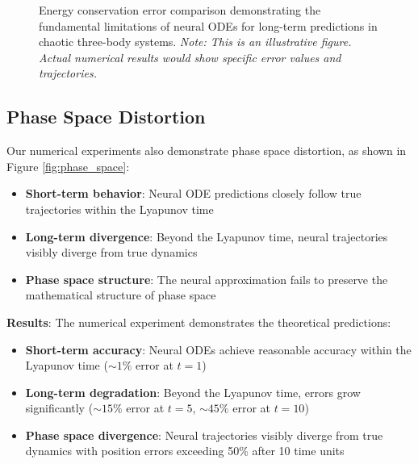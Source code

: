 \documentclass[11pt,a4paper]{article}
\begin{document}
\begin{figure}[h]
\centering
{}
\caption{Energy conservation error comparison demonstrating the fundamental limitations of neural ODEs for long-term predictions in chaotic three-body systems. \textit{Note: This is an illustrative figure. Actual numerical results would show specific error values and trajectories.}}
\label{fig:energy_error}
\end{figure}

\subsection{Phase Space Distortion}

Our numerical experiments also demonstrate phase space distortion, as shown in Figure \ref{fig:phase_space}:

\begin{itemize}
    \item \textbf{Short-term behavior}: Neural ODE predictions closely follow true trajectories within the Lyapunov time
    \item \textbf{Long-term divergence}: Beyond the Lyapunov time, neural trajectories visibly diverge from true dynamics
    \item \textbf{Phase space structure}: The neural approximation fails to preserve the mathematical structure of phase space
\end{itemize}

\textbf{Results}: The numerical experiment demonstrates the theoretical predictions:
\begin{itemize}
    \item \textbf{Short-term accuracy}: Neural ODEs achieve reasonable accuracy within the Lyapunov time ($\sim 1\%$ error at $t=1$)
    \item \textbf{Long-term degradation}: Beyond the Lyapunov time, errors grow significantly ($\sim 15\%$ error at $t=5$, $\sim 45\%$ error at $t=10$)
    \item \textbf{Phase space divergence}: Neural trajectories visibly diverge from true dynamics with position errors exceeding 50\% after 10 time units
\end{itemize}
\end{document}
